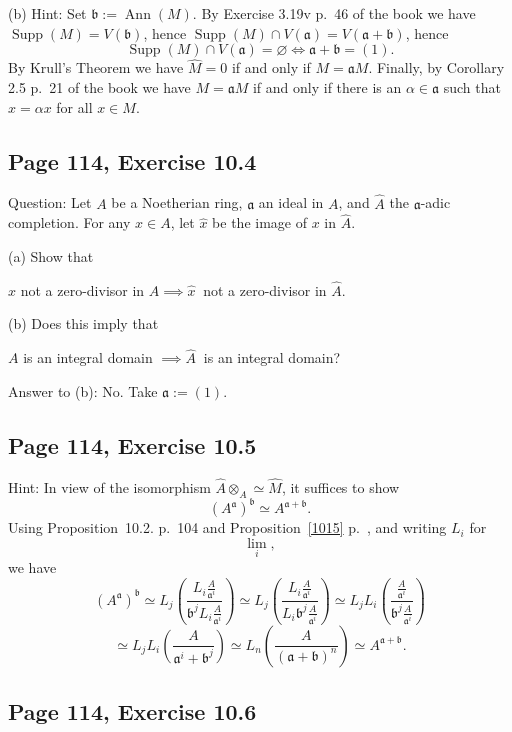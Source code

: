 \documentclass[parskip=half,fontsize=12pt]{scrartcl}%
\newcommand{\oo}{\operatorname}\newcommand{\ooo}{\operatorname*}
\newcommand{\mf}{\mathfrak}
\newcommand{\aaa}{\mf a}
\newcommand{\bbb}{\mf b}
\begin{document}
(b) Hint: Set $\bbb:=\oo{Ann}(M)$. By Exercise 3.19v p.~46 of the book we have $\oo{Supp}(M)=V(\bbb)$, hence $\oo{Supp}(M)\cap V(\aaa)=V(\aaa+\bbb)$, hence 
$$
\oo{Supp}(M)\cap V(\aaa)=\varnothing\iff\aaa+\bbb=(1).
$$ 
By Krull's Theorem we have $\widehat M=0$ if and only if $M=\aaa M$. Finally, by Corollary 2.5 p.~21 of the book we have $M=\aaa M$ if and only if there is an $\alpha\in\aaa$ such that $x=\alpha x$ for all $x\in M$. 

\subsection{Page 114, Exercise 10.4}%

Question: Let $A$ be a Noetherian ring, $\aaa$ an ideal in $A$, and $\widehat A$ the $\aaa$-adic completion. For any $x\in A$, let $\widehat x$ be the image of $x$ in $\widehat A$. 

(a) Show that\smallskip 

\centerline{$x$ not a zero-divisor in $A\implies\widehat x\ $ not a zero-divisor in $\widehat A$.} 

(b) Does this imply that\smallskip 

\centerline{$A$ is an integral domain $\implies\widehat A\ $ is an integral domain?}

Answer to (b): No. Take $\aaa:=(1)$. 

\subsection{Page 114, Exercise 10.5}%

Hint: In view of the isomorphism $\widehat A\otimes_A\simeq\widehat M$, it suffices to show 
\begin{equation}\label{aba+b}
(A^\aaa)^\bbb\simeq A^{\aaa+\bbb}. 
\end{equation} 
Using Proposition~10.2. p.~104 and Proposition~\ref{1015} p.~\pageref{1015}, and writing $L_i$ for 
$$
\lim_i,
$$ 
we have 
$$
(A^\aaa)^\bbb\simeq 
L_j\left(\frac{L_i\frac{A}{\aaa^i}}{\bbb^jL_i\frac{A}{\aaa^i}}\right)\simeq 
L_j\left(\frac{L_i\frac{A}{\aaa^i}}{L_i\bbb^j\frac{A}{\aaa^i}}\right)\simeq 
L_jL_i\left(\frac{\frac{A}{\aaa^i}}{\bbb^j\frac{A}{\aaa^i}}\right)
$$ 
$$
\simeq L_jL_i\left(\frac{A}{\aaa^i+\bbb^j}\right)
\simeq L_n\left(\frac{A}{(\aaa+\bbb)^n}\right)
\simeq A^{\aaa+\bbb}.
$$ 

\subsection{Page 114, Exercise 10.6}%
\end{document}
